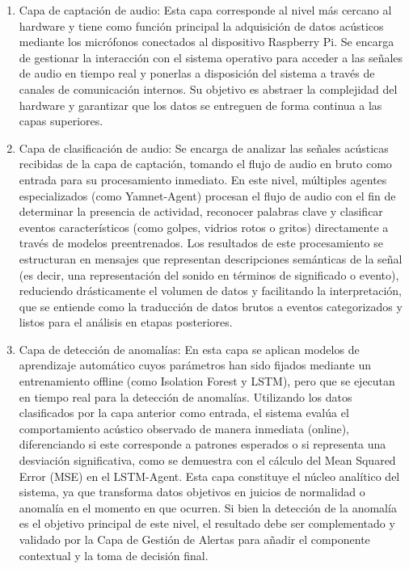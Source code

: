 \begin{enumerate}
      \item Capa de captación de audio: Esta capa corresponde al nivel más cercano al hardware y tiene como función principal la adquisición de datos acústicos mediante los micrófonos conectados al dispositivo Raspberry Pi. Se encarga de gestionar la interacción con el sistema operativo para acceder a las señales de audio en tiempo real y ponerlas a disposición del sistema a través de canales de comunicación internos. Su objetivo es abstraer la complejidad del hardware y garantizar que los datos se entreguen de forma continua a las capas superiores.
      \item Capa de clasificación de audio: Se encarga de analizar las señales acústicas recibidas de la capa de captación, tomando el flujo de audio en bruto como entrada para su procesamiento inmediato. En este nivel, múltiples agentes especializados (como Yamnet-Agent) procesan el flujo de audio con el fin de determinar la presencia de actividad, reconocer palabras clave y clasificar eventos característicos (como golpes, vidrios rotos o gritos) directamente a través de modelos preentrenados. Los resultados de este procesamiento se estructuran en mensajes que representan descripciones semánticas de la señal (es decir, una representación del sonido en términos de significado o evento), reduciendo drásticamente el volumen de datos y facilitando la interpretación, que se entiende como la traducción de datos brutos a eventos categorizados y listos para el análisis en etapas posteriores.
      \item Capa de detección de anomalías: En esta capa se aplican modelos de aprendizaje automático cuyos parámetros han sido fijados mediante un entrenamiento offline (como Isolation Forest y LSTM), pero que se ejecutan en tiempo real para la detección de anomalías. Utilizando los datos clasificados por la capa anterior como entrada, el sistema evalúa el comportamiento acústico observado de manera inmediata (online), diferenciando si este corresponde a patrones esperados o si representa una desviación significativa, como se demuestra con el cálculo del Mean Squared Error (MSE) en el LSTM-Agent. Esta capa constituye el núcleo analítico del sistema, ya que transforma datos objetivos en juicios de normalidad o anomalía en el momento en que ocurren. Si bien la detección de la anomalía es el objetivo principal de este nivel, el resultado debe ser complementado y validado por la Capa de Gestión de Alertas para añadir el componente contextual y la toma de decisión final.

\end{enumerate}
